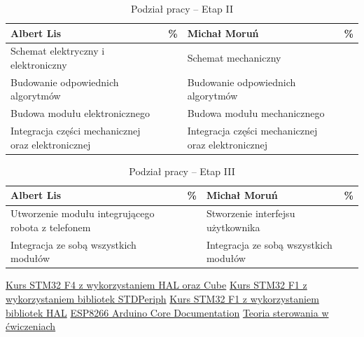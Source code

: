 \documentclass[10pt, a4paper]{article}
\begin{document}
\begin{table}[H]
	\centering
	\begin{tabular}{|L{7cm}|L{0.8cm}||L{7cm}|L{0.8cm}|}
		\hline
		\hline
		\textbf{Albert Lis} & 
		\% & 
		\textbf{Michał Moruń} & \%\\
		\hline
		\hline
		Schemat elektryczny i elektroniczny		& &	
		Schemat mechaniczny &\\
		\hline
		Budowanie odpowiednich algorytmów & &
		Budowanie odpowiednich algorytmów &\\
		\hline
		Budowa modułu elektronicznego & &
		Budowa modułu mechanicznego & \\
		\hline
		Integracja części mechanicznej oraz elektronicznej & & 
		Integracja części mechanicznej oraz elektronicznej &\\
		\hline
	\end{tabular}
	\caption{Podział pracy -- Etap II}
	\label{tab:PodzialPracyEtap2}
\end{table}

\begin{table}[H]
	\centering
	\begin{tabular}{|L{7cm}|L{0.8cm}||L{7cm}|L{0.8cm}|}
		\hline
		\hline
		\textbf{Albert Lis} & 
		\% & 
		\textbf{Michał Moruń} & \%\\
		\hline
		\hline
		Utworzenie modułu integrującego robota z telefonem & &	
		Stworzenie interfejsu użytkownika &\\
		\hline
		 Integracja ze sobą wszystkich modułów & &
		 Integracja ze sobą wszystkich modułów & \\
		\hline
	\end{tabular}
	\caption{Podział pracy -- Etap III}
	\label{tab:PodzialPracyEtap3}
\end{table}



\newpage
%
%
\begin{thebibliography}{9}
	
	\href{https://forbot.pl/blog/kurs-stm32-f4-1-czas-poznac-hal-spis-tresci-kursu-id14114}{Kurs STM32 F4 z wykorzystaniem HAL oraz Cube}
	\href{https://forbot.pl/blog/stm32-praktyce-1-platforma-srodowisko-id2733}{Kurs STM32 F1 z wykorzystaniem bibliotek STDPeriph}
	\href{https://forbot.pl/blog/kurs-stm32-f1-migracja-na-hal-wstep-spis-tresci-id23580} {Kurs STM32 F1 z wykorzystaniem bibliotek HAL}
	\href{https://media.readthedocs.org/pdf/arduino-esp8266/docs_to_readthedocs/arduino-esp8266.pdf} {ESP8266 Arduino Core Documentation}
	\href{https://docer.pl/doc/n5xcex8} {Teoria sterowania w ćwiczeniach}
	
\end{thebibliography}
\end{document}
